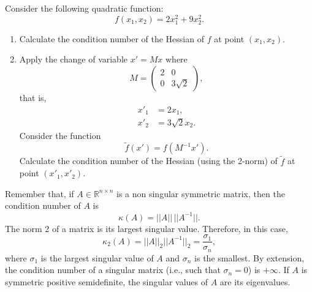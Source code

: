 
Consider the following quadratic function:
\begin{equation}
f(x_1,x_2)=2x_1^2+9x_2^2.
\end{equation}
\begin{enumerate}
\item Calculate the condition number of the Hessian of $f$  at point $(x_1,x_2)$. 
\item Apply the change of variable $x'= M x$ where
  \[
  M= \begin{pmatrix}
    2 & 0 \\ 0 & 3 \sqrt{2}
\end{pmatrix},
  \]
  that is,
  \begin{align*}
    x'_1 &= 2 x_1, \\
    x'_2 &= 3 \sqrt{2} x_2.
  \end{align*}
  Consider the function
  \[
\tilde{f}(x') = f(M^{-1}x').
\]
Calculate the condition number of the Hessian (using the 2-norm) of $\tilde{f}$ at point $(x'_1,x'_2)$. 
\end{enumerate}
\vspace{3cm}
Remember that,
if $A \in \mathbb{R}^{n\times n}$ is a non singular symmetric matrix, then the condition number of $A$ is
\begin{equation}
\kappa(A)=||A||\,||A^{-1}||.
\end{equation}
The norm 2 of a matrix is its largest singular value. Therefore, in this case,
\begin{equation}
\kappa_2(A)=||A||_2||A^{-1}||_2=\frac{\sigma_1}{\sigma_n},
\end{equation}
where $\sigma_1$ is the largest singular value of $A$ and $\sigma_n$ is the smallest. By extension, the condition number of a singular matrix (i.e., such that $\sigma_n=0$) is $+\infty$. If $A$ is symmetric positive semidefinite, the singular values of $A$ are its eigenvalues.

